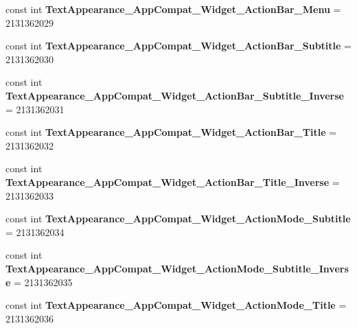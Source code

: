 \begin{DoxyCompactItemize}
const int {\bfseries Text\+Appearance\+\_\+\+App\+Compat\+\_\+\+Widget\+\_\+\+Action\+Bar\+\_\+\+Menu} = 2131362029
\item 
\mbox{\label{classXaria_1_1Resource_1_1Style_a25c2b812603d4faece3d285b6b6621e5}} 
const int {\bfseries Text\+Appearance\+\_\+\+App\+Compat\+\_\+\+Widget\+\_\+\+Action\+Bar\+\_\+\+Subtitle} = 2131362030
\item 
\mbox{\label{classXaria_1_1Resource_1_1Style_a5136e6dac14a230408888ac7abc129cc}} 
const int {\bfseries Text\+Appearance\+\_\+\+App\+Compat\+\_\+\+Widget\+\_\+\+Action\+Bar\+\_\+\+Subtitle\+\_\+\+Inverse} = 2131362031
\item 
\mbox{\label{classXaria_1_1Resource_1_1Style_a37780f997d72b5213d0c63cd5474964c}} 
const int {\bfseries Text\+Appearance\+\_\+\+App\+Compat\+\_\+\+Widget\+\_\+\+Action\+Bar\+\_\+\+Title} = 2131362032
\item 
\mbox{\label{classXaria_1_1Resource_1_1Style_a1e1c388a4a9de60389ecbf7c293d3380}} 
const int {\bfseries Text\+Appearance\+\_\+\+App\+Compat\+\_\+\+Widget\+\_\+\+Action\+Bar\+\_\+\+Title\+\_\+\+Inverse} = 2131362033
\item 
\mbox{\label{classXaria_1_1Resource_1_1Style_abb7c479d120b90845c6e1b10095434a2}} 
const int {\bfseries Text\+Appearance\+\_\+\+App\+Compat\+\_\+\+Widget\+\_\+\+Action\+Mode\+\_\+\+Subtitle} = 2131362034
\item 
\mbox{\label{classXaria_1_1Resource_1_1Style_a58472680620c27f6022e3845f7645620}} 
const int {\bfseries Text\+Appearance\+\_\+\+App\+Compat\+\_\+\+Widget\+\_\+\+Action\+Mode\+\_\+\+Subtitle\+\_\+\+Inverse} = 2131362035
\item 
\mbox{\label{classXaria_1_1Resource_1_1Style_a506e25fa58396a716e9a26aa007543a6}} 
const int {\bfseries Text\+Appearance\+\_\+\+App\+Compat\+\_\+\+Widget\+\_\+\+Action\+Mode\+\_\+\+Title} = 2131362036
\item 
\mbox{\label{classXaria_1_1Resource_1_1Style_af78b18acf609fa0a7b7dc10711668357}} 

\end{DoxyCompactItemize}
